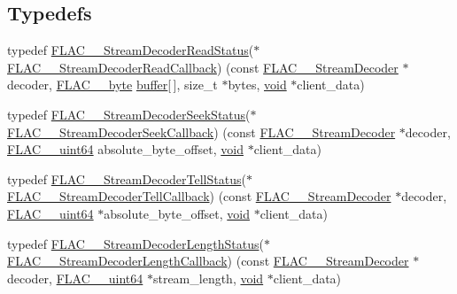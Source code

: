 \subsection*{Typedefs}
\begin{DoxyCompactItemize}
\item 
typedef \mbox{\hyperlink{group__flac__stream__decoder_gad793ead451206c64a91dc0b851027b93}{F\+L\+A\+C\+\_\+\+\_\+\+Stream\+Decoder\+Read\+Status}}($\ast$ \mbox{\hyperlink{group__flac__stream__decoder_ga25d4321dc2f122d35ddc9061f44beae7}{F\+L\+A\+C\+\_\+\+\_\+\+Stream\+Decoder\+Read\+Callback}}) (const \mbox{\hyperlink{struct_f_l_a_c_____stream_decoder}{F\+L\+A\+C\+\_\+\+\_\+\+Stream\+Decoder}} $\ast$decoder, \mbox{\hyperlink{ordinals_8h_a5eb569b12d5b047cdacada4d57924ee3}{F\+L\+A\+C\+\_\+\+\_\+byte}} \mbox{\hyperlink{_s_d_l__opengl__glext_8h_a76461e97a098d2c9ae20ac193d3825ae}{buffer}}\mbox{[}$\,$\mbox{]}, size\+\_\+t $\ast$bytes, \mbox{\hyperlink{_s_d_l__opengles2__gl2ext_8h_ae5d8fa23ad07c48bb609509eae494c95}{void}} $\ast$client\+\_\+data)
\item 
typedef \mbox{\hyperlink{group__flac__stream__decoder_gac8d269e3c7af1a5889d3bd38409ed67d}{F\+L\+A\+C\+\_\+\+\_\+\+Stream\+Decoder\+Seek\+Status}}($\ast$ \mbox{\hyperlink{group__flac__stream__decoder_ga4c18b0216e0f7a83d7e4e7001230545d}{F\+L\+A\+C\+\_\+\+\_\+\+Stream\+Decoder\+Seek\+Callback}}) (const \mbox{\hyperlink{struct_f_l_a_c_____stream_decoder}{F\+L\+A\+C\+\_\+\+\_\+\+Stream\+Decoder}} $\ast$decoder, \mbox{\hyperlink{ordinals_8h_aa78c8c70a3eb8a58af7436f278acde8e}{F\+L\+A\+C\+\_\+\+\_\+uint64}} absolute\+\_\+byte\+\_\+offset, \mbox{\hyperlink{_s_d_l__opengles2__gl2ext_8h_ae5d8fa23ad07c48bb609509eae494c95}{void}} $\ast$client\+\_\+data)
\item 
typedef \mbox{\hyperlink{group__flac__stream__decoder_ga83708207969383bd7b5c1e9148528845}{F\+L\+A\+C\+\_\+\+\_\+\+Stream\+Decoder\+Tell\+Status}}($\ast$ \mbox{\hyperlink{group__flac__stream__decoder_gafdf1852486617a40c285c0d76d451a5a}{F\+L\+A\+C\+\_\+\+\_\+\+Stream\+Decoder\+Tell\+Callback}}) (const \mbox{\hyperlink{struct_f_l_a_c_____stream_decoder}{F\+L\+A\+C\+\_\+\+\_\+\+Stream\+Decoder}} $\ast$decoder, \mbox{\hyperlink{ordinals_8h_aa78c8c70a3eb8a58af7436f278acde8e}{F\+L\+A\+C\+\_\+\+\_\+uint64}} $\ast$absolute\+\_\+byte\+\_\+offset, \mbox{\hyperlink{_s_d_l__opengles2__gl2ext_8h_ae5d8fa23ad07c48bb609509eae494c95}{void}} $\ast$client\+\_\+data)
\item 
typedef \mbox{\hyperlink{group__flac__stream__decoder_gad5860157c2bb34501b8b9370472d727a}{F\+L\+A\+C\+\_\+\+\_\+\+Stream\+Decoder\+Length\+Status}}($\ast$ \mbox{\hyperlink{group__flac__stream__decoder_ga5363f3b46e3f7d6a73385f6560f7e7ef}{F\+L\+A\+C\+\_\+\+\_\+\+Stream\+Decoder\+Length\+Callback}}) (const \mbox{\hyperlink{struct_f_l_a_c_____stream_decoder}{F\+L\+A\+C\+\_\+\+\_\+\+Stream\+Decoder}} $\ast$decoder, \mbox{\hyperlink{ordinals_8h_aa78c8c70a3eb8a58af7436f278acde8e}{F\+L\+A\+C\+\_\+\+\_\+uint64}} $\ast$stream\+\_\+length, \mbox{\hyperlink{_s_d_l__opengles2__gl2ext_8h_ae5d8fa23ad07c48bb609509eae494c95}{void}} $\ast$client\+\_\+data)

\end{DoxyCompactItemize}
